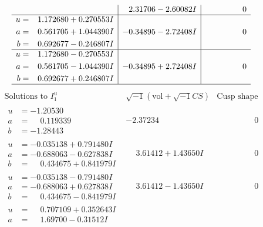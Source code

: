 \documentclass[1p]{elsarticle_modified}
\theoremstyle{definition}
\newcommand{\I}{\sqrt{-1}}
\begin{document}
$$\begin{array}{c|c|c}
 & \phantom{-}2.31706 - 2.60082 I & \phantom{-0.000000 } 0 \\ \hline\begin{aligned}
u &= \phantom{-}1.172680 + 0.270553 I \\
a &= \phantom{-}0.561705 + 1.044390 I \\
b &= \phantom{-}0.692677 - 0.246807 I\end{aligned}
 & -0.34895 - 2.72408 I & \phantom{-0.000000 } 0 \\ \hline\begin{aligned}
u &= \phantom{-}1.172680 - 0.270553 I \\
a &= \phantom{-}0.561705 - 1.044390 I \\
b &= \phantom{-}0.692677 + 0.246807 I\end{aligned}
 & -0.34895 + 2.72408 I & \phantom{-0.000000 } 0\\
 \hline 
 \end{array}$$\newpage$$\begin{array}{c|c|c}  
\text{Solutions to }I^u_{1}& \I (\text{vol} + \sqrt{-1}CS) & \text{Cusp shape}\\
 \hline 
\begin{aligned}
u &= -1.20530\phantom{ +0.000000I} \\
a &= \phantom{-}0.119339\phantom{ +0.000000I} \\
b &= -1.28443\phantom{ +0.000000I}\end{aligned}
 & -2.37234\phantom{ +0.000000I} & \phantom{-0.000000 } 0 \\ \hline\begin{aligned}
u &= -0.035138 + 0.791480 I \\
a &= -0.688063 - 0.627838 I \\
b &= \phantom{-}0.434675 + 0.841979 I\end{aligned}
 & \phantom{-}3.61412 + 1.43650 I & \phantom{-0.000000 } 0 \\ \hline\begin{aligned}
u &= -0.035138 - 0.791480 I \\
a &= -0.688063 + 0.627838 I \\
b &= \phantom{-}0.434675 - 0.841979 I\end{aligned}
 & \phantom{-}3.61412 - 1.43650 I & \phantom{-0.000000 } 0 \\ \hline\begin{aligned}
u &= \phantom{-}0.707109 + 0.352643 I \\
a &= \phantom{-}1.69700 - 0.31512 I \\

\end{aligned}
\end{array}$$
\end{document}
